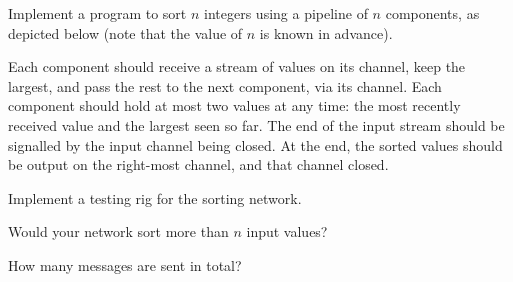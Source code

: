 \begin{question}
Implement a program to sort $n$ integers using a pipeline of $n$
components, as depicted below (note that the value of $n$ is known in
advance).
%
\begin{center}
\end{center}
%
Each component should receive a stream of values on its  channel,
keep the largest, and pass the rest to the next component, via its
 channel.  Each component should hold at most two values at any
time: the most recently received value and the largest seen so far.  The end
of the input stream should be signalled by the input channel being closed.  At
the end, the sorted values should be output on the right-most channel, and
that channel closed.

Implement a testing rig for the sorting network.

Would your network sort more than $n$ input values?

How many messages are sent in total?

\end{question}


